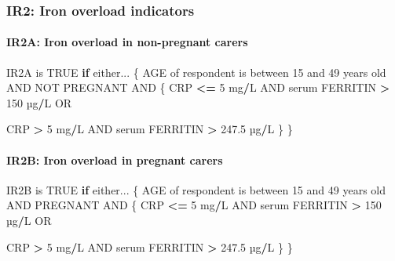 \documentclass[12pt,a4paper]{article}
\newenvironment{Shaded}{\begin{snugshade}}{\end{snugshade}}
\newcommand{\ControlFlowTok}[1]{\textcolor[rgb]{0.13,0.29,0.53}{\textbf{#1}}}
\newcommand{\DecValTok}[1]{\textcolor[rgb]{0.00,0.00,0.81}{#1}}
\newcommand{\FloatTok}[1]{\textcolor[rgb]{0.00,0.00,0.81}{#1}}
\newcommand{\NormalTok}[1]{#1}
\newcommand{\OperatorTok}[1]{\textcolor[rgb]{0.81,0.36,0.00}{\textbf{#1}}}
\newcommand{\OtherTok}[1]{\textcolor[rgb]{0.56,0.35,0.01}{#1}}
\newcommand{\StringTok}[1]{\textcolor[rgb]{0.31,0.60,0.02}{#1}}
\let\oldparagraph\paragraph
\renewcommand{\paragraph}[1]{\oldparagraph{#1}\mbox{}}
\begin{document}
\newpage

\hypertarget{ir2-iron-overload-indicators}{%
\subsubsection{IR2: Iron overload indicators}\label{ir2-iron-overload-indicators}}

\hypertarget{ir2a-iron-overload-in-non-pregnant-carers}{%
\paragraph{IR2A: Iron overload in non-pregnant carers}\label{ir2a-iron-overload-in-non-pregnant-carers}}

\begin{Shaded}
\begin{Highlighting}[]
\NormalTok{IR2A is }\OtherTok{TRUE} \ControlFlowTok{if}\NormalTok{ either...}
\NormalTok{  \{}
\NormalTok{    AGE of respondent is between }\DecValTok{15}\NormalTok{ and }\DecValTok{49}\NormalTok{ years old AND NOT PREGNANT AND}
\NormalTok{    \{}
\NormalTok{      CRP }\OperatorTok{<=}\StringTok{ }\DecValTok{5}\NormalTok{ mg}\OperatorTok{/}\NormalTok{L AND serum FERRITIN }\OperatorTok{>}\StringTok{ }\DecValTok{150}\NormalTok{ µg}\OperatorTok{/}\NormalTok{L OR}
     
\NormalTok{      CRP }\OperatorTok{>}\StringTok{ }\DecValTok{5}\NormalTok{ mg}\OperatorTok{/}\NormalTok{L AND serum FERRITIN }\OperatorTok{>}\StringTok{ }\FloatTok{247.5}\NormalTok{ µg}\OperatorTok{/}\NormalTok{L}
\NormalTok{    \}}
\NormalTok{  \}}
\end{Highlighting}
\end{Shaded}

\hypertarget{ir2b-iron-overload-in-pregnant-carers}{%
\paragraph{IR2B: Iron overload in pregnant carers}\label{ir2b-iron-overload-in-pregnant-carers}}

\begin{Shaded}
\begin{Highlighting}[]
\NormalTok{IR2B is }\OtherTok{TRUE} \ControlFlowTok{if}\NormalTok{ either...}
\NormalTok{  \{}
\NormalTok{    AGE of respondent is between }\DecValTok{15}\NormalTok{ and }\DecValTok{49}\NormalTok{ years old AND PREGNANT AND}
\NormalTok{    \{}
\NormalTok{      CRP }\OperatorTok{<=}\StringTok{ }\DecValTok{5}\NormalTok{ mg}\OperatorTok{/}\NormalTok{L AND serum FERRITIN }\OperatorTok{>}\StringTok{ }\DecValTok{150}\NormalTok{ µg}\OperatorTok{/}\NormalTok{L OR}
     
\NormalTok{      CRP }\OperatorTok{>}\StringTok{ }\DecValTok{5}\NormalTok{ mg}\OperatorTok{/}\NormalTok{L AND serum FERRITIN }\OperatorTok{>}\StringTok{ }\FloatTok{247.5}\NormalTok{ µg}\OperatorTok{/}\NormalTok{L}
\NormalTok{    \}}
\NormalTok{  \}}
\end{Highlighting}
\end{Shaded}
\end{document}
